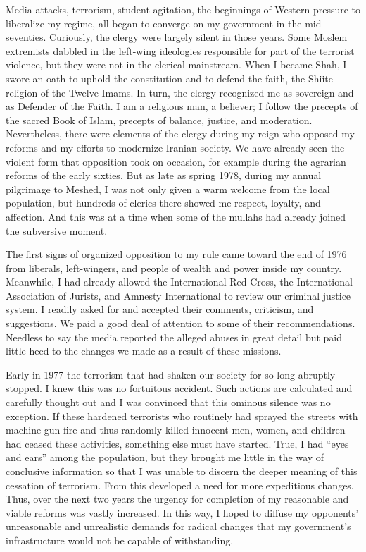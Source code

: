 Media attacks, terrorism, student agitation, the beginnings of Western pressure to liberalize my regime, all began to converge on my government in the mid-seventies. Curiously, the clergy were largely silent in those years. Some Moslem extremists dabbled in the left-wing ideologies responsible for part of the terrorist violence, but they were not in the clerical mainstream. When I became Shah, I swore an oath to uphold the constitution and to defend the faith, the Shiite religion of the Twelve Imams. In turn, the clergy recognized me as sovereign and as Defender of the Faith. I am a religious man, a believer; I follow the precepts of the sacred Book of Islam, precepts of balance, justice, and moderation. Nevertheless, there were elements of the clergy during my reign who opposed my reforms and my efforts to modernize Iranian society. We have already seen the violent form that opposition took on occasion, for example during the agrarian reforms of the early sixties. But as late as spring 1978, during my annual pilgrimage to Meshed, I was not only given a warm welcome from the local population, but hundreds of clerics there showed me respect, loyalty, and affection. And this was at a time when some of the mullahs had already joined the subversive moment. 

The first signs of organized opposition to my rule came toward the end of 1976 from liberals, left-wingers, and people of wealth and power inside my country. Meanwhile, I had already allowed the International Red Cross, the International Association of Jurists, and Amnesty International to review our criminal justice system. I readily asked for and accepted their comments, criticism, and suggestions. We paid a good deal of attention to some of their recommendations. Needless to say the media reported the alleged abuses in great detail but paid little heed to the changes we made as a result of these missions. 

Early in 1977 the terrorism that had shaken our society for so long abruptly stopped. I knew this was no fortuitous accident. Such actions are calculated and carefully thought out and I was convinced that this ominous silence was no exception. If these hardened terrorists who routinely had sprayed the streets with machine-gun fire and thus randomly killed innocent men, women, and children had ceased these activities, something else must have started. True, I had “eyes and ears” among the population, but they brought me little in the way of conclusive information so that I was unable to discern the deeper meaning of this cessation of terrorism. From this developed a need for more expeditious changes. Thus, over the next two years the urgency for completion of my reasonable and viable reforms was vastly increased. In this way, I hoped to diffuse my opponents’ unreasonable and unrealistic demands for radical changes that my government's infrastructure would not be capable of withstanding. 

